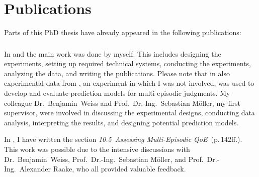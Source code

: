\chapter*{Publications}
Parts of this PhD thesis have already appeared in the following publications:

\begin{refsection}
    \small
    \nocite{guse_macro-temporal_2013}
    \nocite{guse_modelling_2014}
    \nocite{weiss_temporal_2014}
    \printbibliography[heading=none]
\end{refsection}

\subsection*{}
In \citet{guse_macro-temporal_2013} and \citet{guse_modelling_2014} the main work was done by myself.
This includes designing the experiments, setting up required technical systems, conducting the experiments, analyzing the data, and writing the publications.
Please note that in \citet{guse_modelling_2014} also experimental data from \citet{moller_single-call_2011}, an experiment in which I was not involved, was used to develop and evaluate prediction models for multi-episodic judgments.
My colleague Dr.~Benjamin~Weiss and Prof.~Dr.-Ing.~Sebastian Möller, my first supervisor, were involved in discussing the experimental designs, conducting data analysis, interpreting the results, and designing potential prediction models.

In \citet{weiss_temporal_2014}, I have written the section \emph{10.5~Assessing Multi-Episodic QoE}~(p.\,142ff.).
This work was possible due to the intensive discussions with Dr.~Benjamin~Weiss, Prof.~Dr.-Ing.~Sebastian Möller, and Prof.~Dr.-Ing.~Alexander Raake, who all provided valuable feedback.